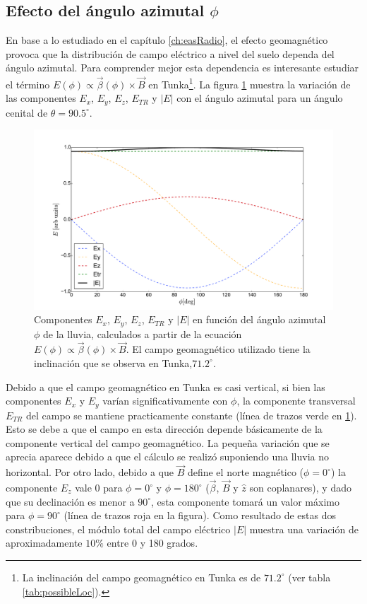 	\subsection{Efecto del \'angulo azimutal $\phi$}
	\label{sbsc:depPhiRadio}
	En base a lo estudiado en el cap\'itulo \ref{ch:easRadio}, el efecto geomagn\'etico provoca que la distribuci\'on de campo el\'ectrico a nivel del suelo dependa del \'angulo azimutal.
	Para comprender mejor esta dependencia es interesante estudiar el t\'ermino $E(\phi)\propto\vec\beta(\phi)\times \vec B$ en Tunka\footnote{La inclinaci\'on del campo geomagn\'etico en Tunka es de $71.2^\circ$ (ver tabla \ref{tab:possibleLoc}).}.
	La figura \ref{fig:geomComps_Tunka} muestra la variaci\'on de las componentes $E_x$, $E_y$, $E_z$, $E_{TR}$ y $|E|$ con el \'angulo azimutal para un \'angulo cenital de $\theta=90.5^\circ$.
	\begin{figure}[ht!]
		\centering
		\includegraphics[width=\textwidth]{./fig/simulacionRadio/geomComps_Tunka}
		\caption{\label{fig:geomComps_Tunka}
		Componentes $E_x$, $E_y$, $E_z$, $E_{TR}$ y $|E|$ en funci\'on del \'angulo azimutal 
		$\phi$ de la lluvia, calculados a partir de la ecuaci\'on $E(\phi)\propto\vec\beta(\phi)\times \vec B$. El campo geomagn\'etico utilizado tiene la inclinaci\'on que se observa en Tunka,$71.2^\circ$. 
		}
	\end{figure}
	Debido a que el campo geomagn\'etico en Tunka es casi vertical, si bien las componentes $E_x$ y $E_y$ var\'ian significativamente con $\phi$, la componente transversal $E_{TR}$ del campo se mantiene practicamente constante (l\'inea de trazos verde en \ref{fig:geomComps_Tunka}). 
	Esto se debe a que el campo en esta direcci\'on depende b\'asicamente de la componente vertical del campo geomagn\'etico.
	La peque\~na variaci\'on que se aprecia aparece debido a que el c\'alculo se realiz\'o suponiendo una lluvia no horizontal.
	Por otro lado, debido a que $\vec B$ define el norte magn\'etico ($\phi=0^\circ$) la componente $E_z$ vale 0 para $\phi=0^\circ$ y $\phi=180^\circ$ ($\vec\beta$, $\vec B$ y $\hat z$ son coplanares), y dado que su declinaci\'on es menor a $90^\circ$, esta componente tomar\'a un valor m\'aximo para $\phi=90^\circ$ (l\'inea de trazos roja en la figura). 
	Como resultado de estas dos constribuciones, el m\'odulo total del campo el\'ectrico $|E|$ muestra una variaci\'on de aproximadamente $10\%$ entre 0 y 180 grados. 
	
